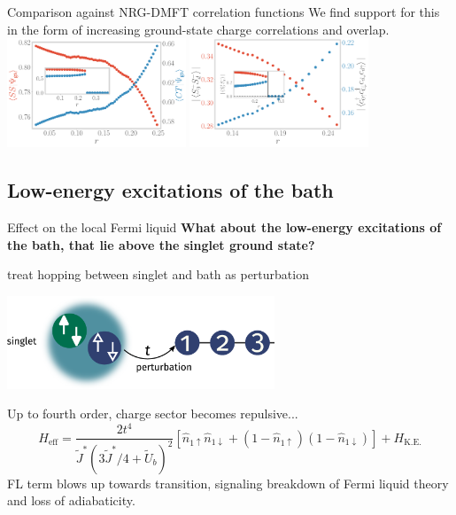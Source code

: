 \documentclass[9pt,aspectratio=169]{beamer}
\begin{document}
\begin{frame}{Comparison against NRG-DMFT correlation functions}
{We find support for this in the form of \alert{increasing ground-state charge correlations and overlap}.\\[5pt]
\includegraphics[width=0.4\textwidth]{corrs_gs.pdf}
\hspace*{\fill}
\includegraphics[width=0.4\textwidth]{pairing.pdf}
}
\end{frame}

\begin{frame}{}
\section{Low-energy excitations of the bath}
\end{frame}

\begin{frame}{Effect on the local Fermi liquid}
	\textbf{What about the \alert{low-energy excitations} of the bath, that lie above the singlet ground state?}
\begin{itemize}
\nitem treat hopping between singlet and bath as perturbation 
\begin{center}
\includegraphics[width=0.6\textwidth]{perturbation.pdf}
\end{center}
\nitem Up to fourth order, charge sector becomes repulsive...
\[H_\text{eff} = \frac{2t^4}{\tilde J^*\left(3\tilde J^*/4 + \tilde U_b \right)^2}\left[\hat n_{1 \uparrow}\hat n_{1 \downarrow} + \left(1 - \hat n_{1 \uparrow}\right)\left(1 - \hat n_{1 \downarrow}\right)\right]  + H_\text{K.E.}\]
\nitem FL term blows up towards transition, signaling \alert{breakdown} of Fermi liquid theory and loss of adiabaticity.
\end{itemize}
\end{frame}
\end{document}

